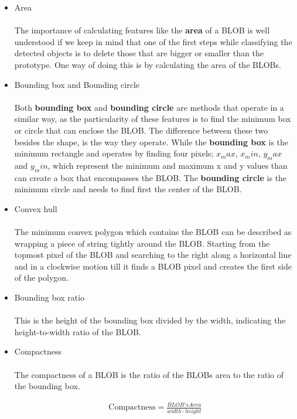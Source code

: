 \begin{itemize}
\item Area
\\
\\
The importance of calculating features like the \textbf{area} of a BLOB is well understood if we keep in mind that one of the first steps while classifying the detected objects is to delete those that are bigger or smaller than the prototype. One way of doing this is by calculating the area of the BLOBs.

\item Bounding box and Bounding circle
\\
\\
Both \textbf{bounding box} and \textbf{bounding circle} are methods that operate in a similar way, as the particularity of these features is to find the minimum box or circle that can enclose the BLOB. The difference between these two besides the shape, is the way they operate. While the \textbf{bounding box} is the minimum rectangle and operates by finding four pixels; $x_max$, $x_min$, $y_max$ and $y_min$, which represent the minimum and maximum x and y values than can create a box that encompasses the BLOB. The \textbf{bounding circle} is the minimum circle and needs to find first the center of the BLOB.

\item Convex hull
\\
\\
The minimum convex polygon which contains the BLOB can be described as wrapping a piece of string tightly around the BLOB. Starting from the topmost pixel of the BLOB and searching to the right along a horizontal line and in a clockwise motion till it finds a BLOB pixel and creates the first side of the polygon.

\item Bounding box ratio
\\
\\
This is the height of the bounding box divided by the width, indicating the height-to-width ratio of the BLOB.

\item Compactness
\\
\\
The compactness of a BLOB is the ratio of the BLOBs area to the ratio of the bounding box.

\begin{equation}
	\begin{aligned}
	\text{Compactness}=\displaystyle\frac{BLOB's Area}{width\cdot{height}}
	\label{Compact}
	\end{aligned}
\end{equation}


\end{itemize}
